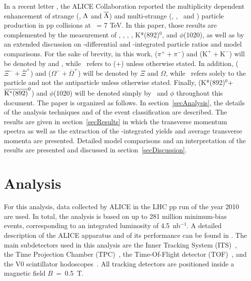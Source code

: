 \documentclass[ALICE,manyauthors]{cernphprep}
\begin{document}
In a recent letter \cite{Adam:2016emw}, the ALICE Collaboration reported the multiplicity dependent enhancement of strange (\kzero, $\Lambda$ and $\overline{\Lambda}$) and multi-strange (\X, \Om, \Ix\ and \Mo) particle production in pp collisions at  \s\ = 7 TeV. In this paper, those results are complemented by the measurement of  \pipm, \kapm, \p, \pbar, K*(892)$^{0}$, and $\phi$(1020), as well as by an extended discussion on \pt-differential and \pt-integrated particle ratios and model comparisons. For the sake of brevity, in this work, ($\pi^{+}+\pi^{-}$) and ($\mathrm{K}^{+}+\mathrm{K}^{-}$) will be denoted by \pipm and \kapm, while \p\ refers to 
(\p+\pbar) unless otherwise stated. In addition, ($\Xi^{-}+\overline{\Xi}^{+}$) and ($\Omega^{-}+\overline{\Omega}^{+}$) will be denoted by $\Xi$ and $\Omega$, while \lmb\ refers solely to the particle and not the antiparticle unless otherwise stated. 
Finally, (K*(892)$^{0}$+$\overline{\rm{K}^{*}(892)}^{0}$) and $\phi$(1020) will be denoted simply by \kstar\ and $\phi$ throughout this document. 
The paper is organized as follows. In section~\ref{secAnalysis}, the details of the analysis techniques and of the event classification are described. The results are given in section~\ref{secResults} in which the transverse momentum spectra as well as the extraction of the \pt-integrated yields and average transverse momenta are presented. Detailed model comparisons and an interpretation of the results are presented and discussed in section~\ref{secDiscussion}.




\section{\label{secAnalysis}Analysis}

For this analysis, data collected by ALICE in the LHC pp run of the year 2010 are used. In total, the analysis is based on up to 281 million minimum-bias events, corresponding to an integrated luminosity of 4.5~nb$^{-1}$. 
A detailed description of the ALICE apparatus and of its performance can be found in \cite{Aamodt:2008zz,Abelev:2014ffa}. The main subdetectors used in this analysis are the Inner Tracking System (ITS)~\cite{its,Aamodt:2010aa}, the Time Projection Chamber (TPC)~\cite{Alme:2010ke}, the Time-Of-Flight detector (TOF)~\cite{Akindinov2013},  and the V0 scintillator hodoscopes~\cite{1748-0221-8-10-P10016}. 
All tracking detectors are positioned inside a magnetic field $B$~=~0.5~T. 
\end{document}
